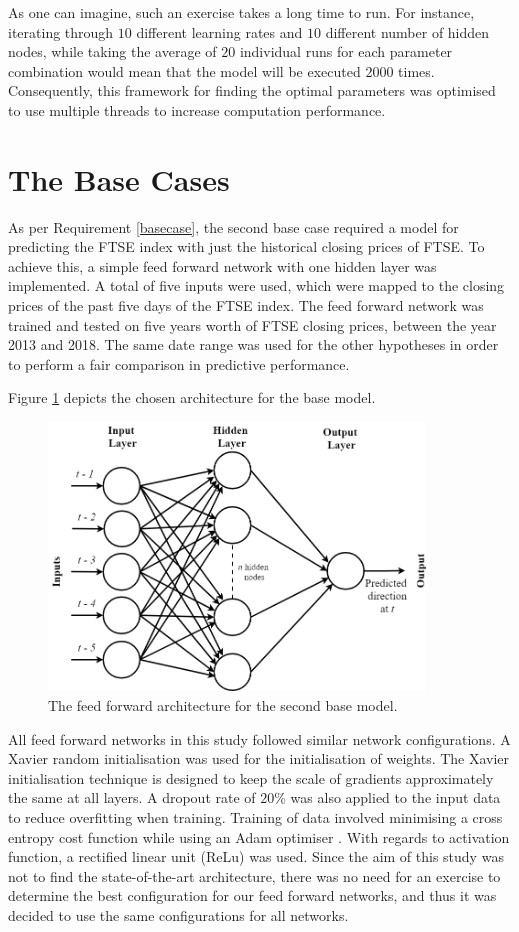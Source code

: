 \documentclass{UoYCSproject}
\begin{document}
As one can imagine, such an exercise takes a long time to run. For instance, iterating through $10$ different learning rates and $10$ different number of hidden nodes, while taking the average of $20$ individual runs for each parameter combination would mean that the model will be executed $2000$ times. Consequently, this framework for finding the optimal parameters was optimised to use multiple threads to increase computation performance.   

\section{The Base Cases}
\label{sec:thebasecase}
As per Requirement \ref{basecase}, the second base case required a model for predicting the FTSE index with just the historical closing prices of FTSE.  To achieve this, a simple feed forward network with one hidden layer was implemented. A total of five inputs were used, which were mapped to the closing prices of the past five days of the FTSE index. The feed forward network was trained and tested on five years worth of FTSE closing prices, between the year 2013 and 2018. The same date range was used for the other hypotheses in order to perform a fair comparison in predictive performance.

Figure \ref{fig:basecase} depicts the chosen architecture for the base model. 

\begin{figure}[h]
\includegraphics[width=10cm]{Base_case_diagram.png}
\centering
\caption{The feed forward architecture for the second base model.} 
\label{fig:basecase}
\end{figure}

All feed forward networks in this study followed similar network configurations. A Xavier \cite{glorot2010understanding} random initialisation was used for the initialisation of weights. The Xavier initialisation technique is designed to keep the scale of gradients approximately the same at all layers. A dropout rate of $20$\% was also applied to the input data to reduce overfitting when training. Training of data involved minimising a cross entropy cost function while using an Adam optimiser \cite{kingma2014adam}. With regards to activation function, a rectified linear unit (ReLu) was used. Since the aim of this study was not to find the state-of-the-art architecture, there was no need for an exercise to determine the best configuration for our feed forward networks, and thus it was decided to use the same configurations for all networks. 
\end{document}
